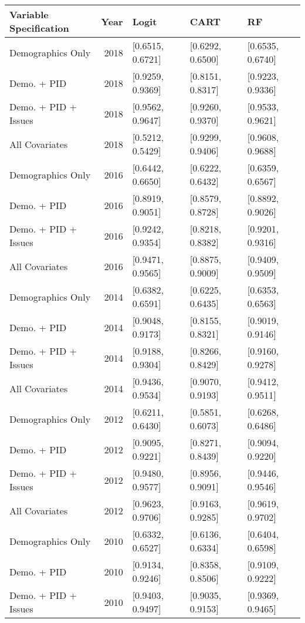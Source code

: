 \begin{longtable}{lrlll}
  \toprule
Variable Specification & Year & Logit & CART & RF \\ 
  \midrule
Demographics Only & 2018 & [0.6515, 0.6721] & [0.6292, 0.6500] & [0.6535, 0.6740] \\ 
  Demo. + PID & 2018 & [0.9259, 0.9369] & [0.8151, 0.8317] & [0.9223, 0.9336] \\ 
  Demo. + PID + Issues & 2018 & [0.9562, 0.9647] & [0.9260, 0.9370] & [0.9533, 0.9621] \\ 
  All Covariates & 2018 & [0.5212, 0.5429] & [0.9299, 0.9406] & [0.9608, 0.9688] \\ 
  Demographics Only & 2016 & [0.6442, 0.6650] & [0.6222, 0.6432] & [0.6359, 0.6567] \\ 
  Demo. + PID & 2016 & [0.8919, 0.9051] & [0.8579, 0.8728] & [0.8892, 0.9026] \\ 
  Demo. + PID + Issues & 2016 & [0.9242, 0.9354] & [0.8218, 0.8382] & [0.9201, 0.9316] \\ 
  All Covariates & 2016 & [0.9471, 0.9565] & [0.8875, 0.9009] & [0.9409, 0.9509] \\ 
  Demographics Only & 2014 & [0.6382, 0.6591] & [0.6225, 0.6435] & [0.6353, 0.6563] \\ 
  Demo. + PID & 2014 & [0.9048, 0.9173] & [0.8155, 0.8321] & [0.9019, 0.9146] \\ 
  Demo. + PID + Issues & 2014 & [0.9188, 0.9304] & [0.8266, 0.8429] & [0.9160, 0.9278] \\ 
  All Covariates & 2014 & [0.9436, 0.9534] & [0.9070, 0.9193] & [0.9412, 0.9511] \\ 
  Demographics Only & 2012 & [0.6211, 0.6430] & [0.5851, 0.6073] & [0.6268, 0.6486] \\ 
  Demo. + PID & 2012 & [0.9095, 0.9221] & [0.8271, 0.8439] & [0.9094, 0.9220] \\ 
  Demo. + PID + Issues & 2012 & [0.9480, 0.9577] & [0.8956, 0.9091] & [0.9446, 0.9546] \\ 
  All Covariates & 2012 & [0.9623, 0.9706] & [0.9163, 0.9285] & [0.9619, 0.9702] \\ 
  Demographics Only & 2010 & [0.6332, 0.6527] & [0.6136, 0.6334] & [0.6404, 0.6598] \\ 
  Demo. + PID & 2010 & [0.9134, 0.9246] & [0.8358, 0.8506] & [0.9109, 0.9222] \\ 
  Demo. + PID + Issues & 2010 & [0.9403, 0.9497] & [0.9035, 0.9153] & [0.9369, 0.9465] \\ 

\end{longtable}
